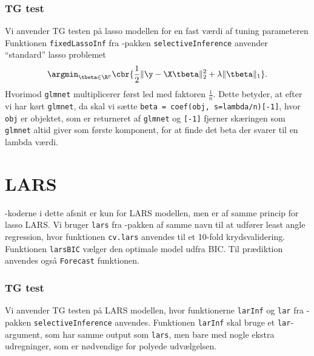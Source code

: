 \subsubsection{TG test} \label{subsubsec:inferens}
Vi anvender TG testen på lasso modellen for en fast værdi af tuning parameteren 
Funktionen \texttt{fixedLassoInf} fra \Rlang-pakken \texttt{selectiveInference}  anvender ``standard'' lasso problemet
\begin{align*}
\argmin_{\tbeta \in \R^p} \cbr{\frac{1}{2} \Vert \y - \X \tbeta \Vert_2^2 + \lambda \Vert \tbeta \Vert_1}.
\end{align*}
Hvorimod \texttt{glmnet} multiplicerer først led med faktoren \(\frac{1}{n}\).
Dette betyder, at efter vi har kørt \texttt{glmnet}, da skal vi sætte \texttt{beta = coef(obj, s=lambda/n)[-1]}, hvor \texttt{obj} er objektet, som er returneret af \texttt{glmnet} og \texttt{[-1]} fjerner skæringen som \texttt{glmnet} altid giver som første komponent, for at finde det beta der svarer til en lambda værdi.
%
%

\section{LARS} \label{subsec:lars}
\Rlang-koderne i dette afsnit er kun for LARS modellen, men er af samme princip for lasso LARS.
Vi bruger \texttt{lars} fra  \Rlang-pakken af samme navn til at udfører least angle regression, hvor funktionen \texttt{cv.lars} anvendes til et 10-fold krydsvalidering. 
Funktionen \texttt{larsBIC} vælger den optimale model udfra BIC. 
Til prædiktion anvendes også \texttt{Forecast} funktionen.

\subsubsection{TG test} \label{subsubsec:inferens}
Vi anvender TG testen på LARS modellen, hvor funktionerne \texttt{larInf} og \texttt{lar}  fra  \Rlang-pakken \texttt{selectiveInference} anvendes. 
Funktionen \texttt{larInf} skal bruge et \texttt{lar}-argument, som har samme output som  \texttt{lars}, men bare med nogle ekstra udregninger, som er nødvendige for polyede udvælgelsen. 



